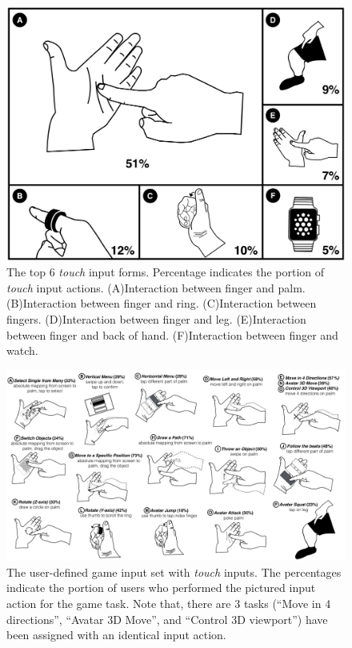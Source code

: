 \documentclass{sigchi}
\begin{document}
   \begin{figure}[!h]
    \centering
    \includegraphics[width=0.9\columnwidth]{OnBodyForms.pdf}
    \caption{The top 6 \emph{touch} input forms. Percentage indicates the portion of \emph{touch} input actions. (A)Interaction between finger and palm. (B)Interaction between finger and ring. (C)Interaction between fingers. (D)Interaction between finger and leg. (E)Interaction between finger and back of hand. (F)Interaction between finger and watch.}
    \label{fig:figureOnBodyPorpotion}
    \end{figure}   


  \begin{figure}
  \centering
  \includegraphics[width=1\textwidth]{OnBodyInputSet.pdf}
  \caption{The user-defined game input set with \emph{touch} inputs. The percentages indicate the portion of users who performed the pictured input action for the game task. Note that, there are 3 tasks (``Move in 4 directions'', ``Avatar 3D Move'', and ``Control 3D viewport'') have been assigned with an identical input action.}
  \label{fig:OnBodyInputSet}
  \end{figure}
\end{document}
